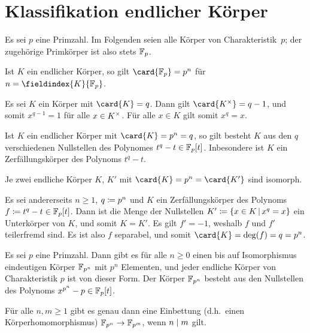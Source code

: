 \section{Klassifikation endlicher Körper}

Es sei $p$ eine Primzahl.
Im Folgenden seien alle Körper von Charakteristik~$p$;
der zugehörige Primkörper ist also stets $\mathbb{F}_p$.

\begin{lemma}
  Ist $K$ ein endlicher Körper, so gilt $\card{\Finite_p} = p^n$ für $n = \fieldindex{K}{\Finite_p}$.
\end{lemma}

Es sei $K$ ein Körper mit $\card{K} = q$.
Dann gilt $\card{\unitgroup{K}} = q-1$, und somit $x^{q-1} = 1$ für alle $x \in K^{\times}$.
Für alle $x \in K$ gilt somit $x^q = x$.

\begin{lemma}
  Ist $K$ ein endlicher Körper mit $\card{K} = p^n = q$, so gilt besteht $K$ aus den $q$ verschiedenen Nullstellen des Polynomes $t^q - t \in \mathbb{F}_p[t]$.
  Inbesondere ist $K$ ein Zerfällungskörper des Polynoms $t^q - t$.
\end{lemma}

\begin{corollary}
  Je zwei endliche Körper $K$, $K'$ mit $\card{K} = p^n = \card{K'}$ sind isomorph.
\end{corollary}

Es sei andererseits $n \geq 1$, $q \coloneqq p^n$ und $K$ ein Zerfällungskörper des Polynoms $f \coloneqq t^q - t \in \mathbb{F}_p[t]$.
Dann ist die Menge der Nullstellen $K' \defined \{x \in K \suchthat x^q = x \}$ ein Unterkörper von $K$, und somit $K = K'$.
Es gilt $f' = -1$, weshalb $f$ und $f'$ teilerfremd sind.
Es ist also $f$ separabel, und somit $\card{K} = \deg(f) = q = p^n$.

\begin{theorem}
  Es sei $p$ eine Primzahl.
  Dann gibt es für alle $n \geq 0$ einen bis auf Isomorphismus eindeutigen Körper $\mathbb{F}_{p^n}$ mit $p^n$ Elementen, und jeder endliche Körper von Charakteristik $p$ ist von dieser Form.
  Der Körper $\mathbb{F}_{p^n}$ besteht aus den Nullstellen des Polynoms $x^{p^n} - p \in \mathbb{F}_p[t]$.
\end{theorem}

\begin{lemma}
  Für alle $n, m \geq 1$ gibt es genau dann eine Einbettung \textup(d.h.\ einen Körperhomomorphismus\textup) $\mathbb{F}_{p^n} \to \mathbb{F}_{p^m}$, wenn $n \mathrel{|} m$ gilt.
\end{lemma}





